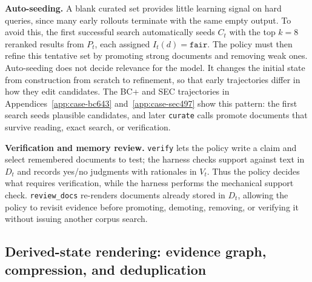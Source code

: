 \documentclass{article}
\newcommand{\verify}{\texttt{verify}\xspace}
\newcommand{\curate}{\texttt{curate}\xspace}
\begin{document}
\textbf{Auto-seeding.}
A blank curated set provides little learning signal on hard queries, since many
early rollouts terminate with the same empty output. To avoid this, the first
successful search automatically seeds $C_t$ with the top $k{=}8$ reranked
results from $P_t$, each assigned $I_t(d)=\texttt{fair}$. The policy must then
refine this tentative set by promoting strong documents and removing weak ones.
Auto-seeding does not decide relevance for the model. It changes the initial
state from construction from scratch to refinement, so that early trajectories
differ in how they edit candidates. The BC+ and SEC trajectories in
Appendices~\ref{app:case-bc643} and~\ref{app:case-sec497} show this pattern:
the first search seeds plausible candidates, and later \curate calls promote
documents that survive reading, exact search, or verification.

\textbf{Verification and memory review.}
\verify lets the policy write a claim and select remembered documents to test;
the harness checks support against text in $D_t$ and records yes/no judgments
with rationales in $V_t$. Thus the policy decides what requires verification,
while the harness performs the mechanical support check. \texttt{review\_docs}
re-renders documents already stored in $D_t$, allowing the policy to revisit
evidence before promoting, demoting, removing, or verifying it without issuing
another corpus search.


\subsection{Derived-state rendering: evidence graph, compression, and deduplication}
\label{sec:method:render}
\end{document}
